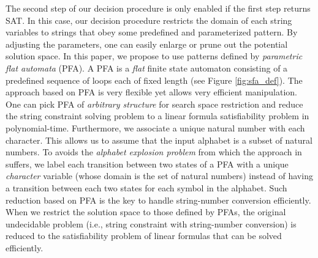 \documentclass[sigplan,review,anonymous]{acmart}\settopmatter{printfolios=true,printccs=false,printacmref=false}
\begin{document}
The second step of our decision procedure is only enabled if the first step returns SAT. In this case, our decision procedure restricts the domain of each string variables to strings that obey some predefined and parameterized pattern. By adjusting the parameters, one can easily enlarge or prune out the potential solution space. In this paper, we propose to use patterns defined by \emph{parametric flat automata} (PFA). A PFA is a {\em flat} finite state automaton consisting of a predefined sequence of loops each of fixed length (see Figure \ref{fig:sfa_def}). The approach based on PFA is very flexible yet allows very efficient manipulation. One can pick PFA of \emph{arbitrary structure} for search space restriction and reduce the string constraint solving problem to a linear formula satisfiability problem in polynomial-time. Furthermore, we associate a unique natural number with each character. This allows us to assume that the input alphabet is a subset of natural numbers. To avoids the \textit{alphabet explosion problem} from which the approach in~\cite{abdulla2017flatten} suffers, we label each transition between two states of a PFA with a unique \emph{character} variable (whose domain is the set of natural numbers) instead of having a transition between each two states for each symbol in the alphabet.  
Such reduction based on PFA is the key to handle string-number conversion efficiently. When we restrict the solution space to those defined by PFAs, the original undecidable problem (i.e., string constraint with string-number conversion) is reduced to the satisfiability problem of linear formulas that can be solved efficiently. 

\end{document}
